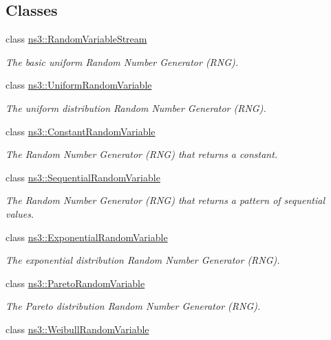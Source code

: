 \subsection*{Classes}
\begin{DoxyCompactItemize}
\item 
class \hyperlink{classns3_1_1RandomVariableStream}{ns3\+::\+Random\+Variable\+Stream}
\begin{DoxyCompactList}\small\item\em The basic uniform Random Number Generator (R\+NG). \end{DoxyCompactList}\item 
class \hyperlink{classns3_1_1UniformRandomVariable}{ns3\+::\+Uniform\+Random\+Variable}
\begin{DoxyCompactList}\small\item\em The uniform distribution Random Number Generator (R\+NG). \end{DoxyCompactList}\item 
class \hyperlink{classns3_1_1ConstantRandomVariable}{ns3\+::\+Constant\+Random\+Variable}
\begin{DoxyCompactList}\small\item\em The Random Number Generator (R\+NG) that returns a constant. \end{DoxyCompactList}\item 
class \hyperlink{classns3_1_1SequentialRandomVariable}{ns3\+::\+Sequential\+Random\+Variable}
\begin{DoxyCompactList}\small\item\em The Random Number Generator (R\+NG) that returns a pattern of sequential values. \end{DoxyCompactList}\item 
class \hyperlink{classns3_1_1ExponentialRandomVariable}{ns3\+::\+Exponential\+Random\+Variable}
\begin{DoxyCompactList}\small\item\em The exponential distribution Random Number Generator (R\+NG). \end{DoxyCompactList}\item 
class \hyperlink{classns3_1_1ParetoRandomVariable}{ns3\+::\+Pareto\+Random\+Variable}
\begin{DoxyCompactList}\small\item\em The Pareto distribution Random Number Generator (R\+NG). \end{DoxyCompactList}\item 
class \hyperlink{classns3_1_1WeibullRandomVariable}{ns3\+::\+Weibull\+Random\+Variable}

\end{DoxyCompactItemize}
